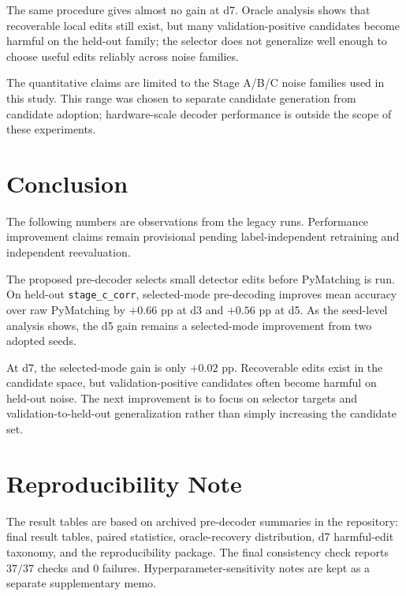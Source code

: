 \documentclass[aps,prd,12pt,twocolumn,superscriptaddress,floatfix,longbibliography]{revtex4-2}
\begin{document}
The same procedure gives almost no gain at d7. Oracle analysis shows that
recoverable local edits still exist, but many validation-positive candidates
become harmful on the held-out family; the selector does not generalize well
enough to choose useful edits reliably across noise families.

The quantitative claims are limited to the Stage A/B/C noise families used in
this study. This range was chosen to separate candidate generation from
candidate adoption; hardware-scale decoder performance is outside the scope of
these experiments.

\section{Conclusion}

The following numbers are observations from the legacy runs. Performance
improvement claims remain provisional pending label-independent retraining
and independent reevaluation.

The proposed pre-decoder selects small detector edits before PyMatching is run.
On held-out \texttt{stage\_c\_corr}, selected-mode
pre-decoding improves mean accuracy over raw PyMatching by \(+0.66\) pp at d3
and \(+0.56\) pp at d5. As the seed-level analysis shows, the d5 gain remains a
selected-mode improvement from two adopted seeds.

At d7, the selected-mode gain is only \(+0.02\) pp. Recoverable edits exist in
the candidate space, but validation-positive candidates often become harmful
on held-out noise. The next improvement is to focus on selector targets and
validation-to-held-out generalization rather than simply increasing the
candidate set.

\section*{Reproducibility Note}

The result tables are based on archived pre-decoder summaries in the
repository: final result tables, paired statistics, oracle-recovery
distribution, d7 harmful-edit taxonomy, and the reproducibility package. The
final consistency check reports \(37/37\) checks and \(0\) failures.
Hyperparameter-sensitivity notes are kept as a separate supplementary memo.



\end{document}
